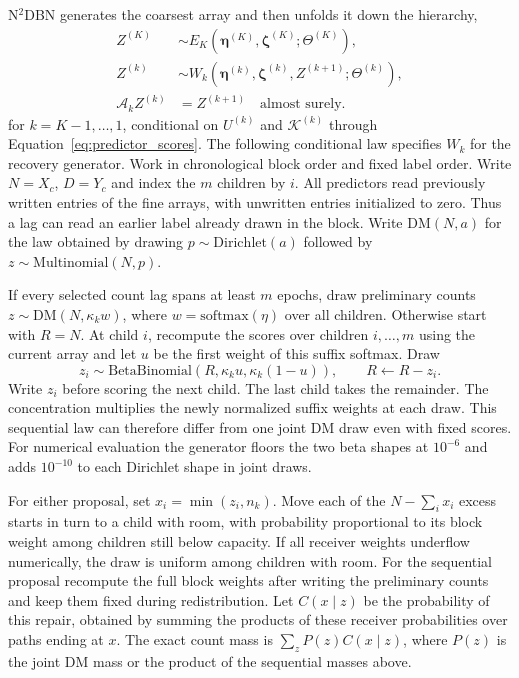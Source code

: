 \documentclass[sigconf]{acmart}
\begin{document}
N\(^{2}\)DBN generates the coarsest array and then unfolds it down the hierarchy,
\begin{align}
  Z^{(K)}&\sim E_K(\boldsymbol\eta^{(K)},
  \boldsymbol\zeta^{(K)};\Theta^{(K)}),
  \nonumber\\
  Z^{(k)}&\sim W_k(\boldsymbol\eta^{(k)},\boldsymbol\zeta^{(k)},
  Z^{(k+1)};\Theta^{(k)}),
  \label{eq:top_down_generation}\\[-2pt]
  \mathcal A_k Z^{(k)}&=Z^{(k+1)}\quad\text{almost surely}.
  \nonumber
\end{align}
for \(k=K-1,\ldots,1\), conditional on \(U^{(k)}\) and \(\mathcal K^{(k)}\) through Equation~\eqref{eq:predictor_scores}. The following conditional law specifies \(W_k\) for the recovery generator. Work in chronological block order and fixed label order. Write \(N=X_c\), \(D=Y_c\) and index the \(m\) children by \(i\). All predictors read previously written entries of the fine arrays, with unwritten entries initialized to zero. Thus a lag can read an earlier label already drawn in the block. Write \(\mathrm{DM}(N,a)\) for the law obtained by drawing \(p\sim\mathrm{Dirichlet}(a)\) followed by \(z\sim\mathrm{Multinomial}(N,p)\).

If every selected count lag spans at least \(m\) epochs, draw preliminary counts \(z\sim\mathrm{DM}(N,\kappa_k w)\), where \(w=\mathrm{softmax}(\eta)\) over all children. Otherwise start with \(R=N\). At child \(i\), recompute the scores over children \(i,\ldots,m\) using the current array and let \(u\) be the first weight of this suffix softmax. Draw
\[
 z_i\sim\mathrm{BetaBinomial}(R,\kappa_k u,\kappa_k(1-u)),
 \qquad R\gets R-z_i .
\]
Write \(z_i\) before scoring the next child. The last child takes the remainder. The concentration multiplies the newly normalized suffix weights at each draw. This sequential law can therefore differ from one joint DM draw even with fixed scores. For numerical evaluation the generator floors the two beta shapes at \(10^{-6}\) and adds \(10^{-10}\) to each Dirichlet shape in joint draws.

For either proposal, set \(x_i=\min(z_i,n_k)\). Move each of the \(N-\sum_i x_i\) excess starts in turn to a child with room, with probability proportional to its block weight among children still below capacity. If all receiver weights underflow numerically, the draw is uniform among children with room. For the sequential proposal recompute the full block weights after writing the preliminary counts and keep them fixed during redistribution. Let \(C(x\mid z)\) be the probability of this repair, obtained by summing the products of these receiver probabilities over paths ending at \(x\). The exact count mass is \(\sum_z P(z)C(x\mid z)\), where \(P(z)\) is the joint DM mass or the product of the sequential masses above.
\end{document}
